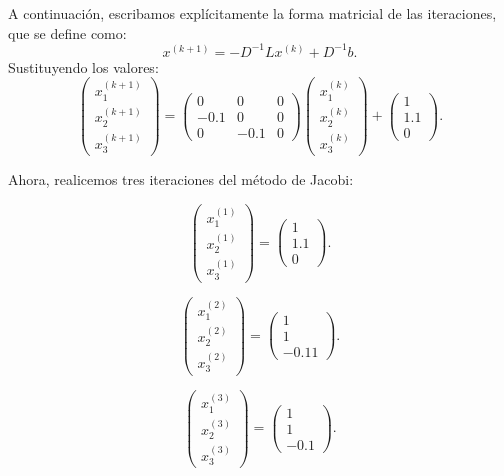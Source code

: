 \begin{homeworkProblem}
\begin{enumerate}
\begin{solucion}
A continuación, escribamos explícitamente la forma matricial de las iteraciones, que se define como:
\[
x^{(k+1)} = -D^{-1} L x^{(k)} + D^{-1} b.
\]
Sustituyendo los valores:
\[
\begin{pmatrix}
            x_1^{(k+1)} \\
            x_2^{(k+1)} \\
            x_3^{(k+1)}
\end{pmatrix}
=
\begin{pmatrix}
            0 & 0 & 0\\
            -0.1 & 0 & 0\\
            0 & -0.1 & 0
\end{pmatrix}
\begin{pmatrix}
            x_1^{(k)} \\
            x_2^{(k)} \\
            x_3^{(k)}
\end{pmatrix}
+
\begin{pmatrix}
            1 \\
            1.1 \\
            0
\end{pmatrix}.
\]

Ahora, realicemos tres iteraciones del método de Jacobi:

\[
\begin{pmatrix}
            x_1^{(1)} \\
            x_2^{(1)} \\
            x_3^{(1)}
\end{pmatrix}
=
\begin{pmatrix}
            1 \\
            1.1 \\
            0
\end{pmatrix}.
\]

\[
\begin{pmatrix}
            x_1^{(2)} \\
            x_2^{(2)} \\
            x_3^{(2)}
\end{pmatrix}
=
\begin{pmatrix}
            1 \\
            1 \\
            -0.11
\end{pmatrix}.
\]

\[
\begin{pmatrix}
            x_1^{(3)} \\
            x_2^{(3)} \\
            x_3^{(3)}
\end{pmatrix}
=
\begin{pmatrix}
            1 \\
            1 \\
            -0.1
\end{pmatrix}.
\]


\end{solucion}
\end{enumerate}
\end{homeworkProblem}
